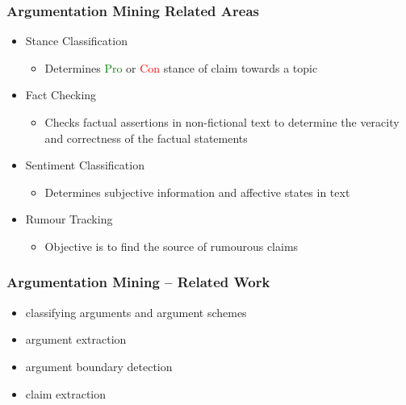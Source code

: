 \documentclass{beamer}
\begin{document}
\begin{frame}
\frametitle{Argumentation Mining Related Areas}

\begin{itemize}
	\item Stance Classification \cite{anand2011cats, mohammad2016semeval}
	\begin{itemize}
		\item Determines \textcolor{green}{Pro} or \textcolor{red}{Con} stance of claim towards a topic
	\end{itemize}
\item Fact Checking \cite{vlachos2014fact, ciampaglia2015computational}
	\begin{itemize}
		\item Checks factual assertions in non-fictional text to determine the
			veracity and correctness of the factual statements
	\end{itemize}
\item Sentiment Classification \cite{bakshi2016opinion, sobhani2016detecting}
	\begin{itemize}
		\item Determines subjective information and affective states in text
	\end{itemize}
\item Rumour Tracking \cite{gorrell2019semeval}
	\begin{itemize}
		\item Objective is to find the source of rumourous claims
	\end{itemize}
\end{itemize}

\end{frame}

\begin{frame}
	\frametitle{Argumentation Mining -- Related Work}
	\begin{itemize}
		\item classifying arguments and argument schemes \cite{palau2009argumentation}
		\item argument extraction \cite{hasan2014you}
		\item argument boundary detection \cite{lippi2015context}
		\item claim extraction \cite{levy2014context}
	\end{itemize}
\end{frame}
\end{document}
